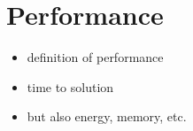 \section{Performance}

\begin{itemize}
    \item definition of performance
    \item time to solution
    \item but also energy, memory, etc.
\end{itemize}
